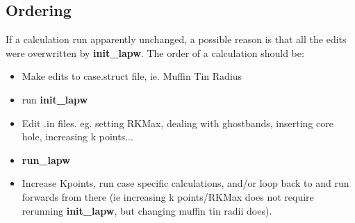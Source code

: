 \documentclass[12pt]{article}
\begin{document}
\subsection{Ordering}
If a calculation run apparently unchanged, a possible reason is that all the edits were overwritten by \textbf{init\_lapw}.  The order of a calculation should be: 
\begin{itemize}
	\item Make edits to case.struct file, ie. Muffin Tin Radius
	\item run \textbf{init\_lapw}
	\item  Edit .in files. eg. setting RKMax, dealing with ghostbands, inserting core hole, increasing k points...
	\item \textbf{run\_lapw}
	\item Increase Kpoints, run case specific calculations,  and/or loop back to and run forwards from there (ie increasing k points/RKMax does not require rerunning \textbf{init\_lapw}, but changing muffin tin radii does).
\end{itemize}
\end{document}
